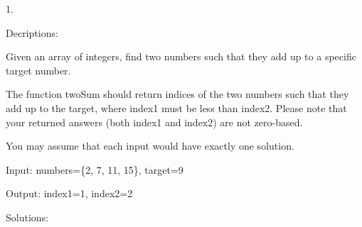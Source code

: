 1.

Decriptions:

	Given an array of integers, find two numbers such that they add up to a specific target number.

The function twoSum should return indices of the two numbers such that they add up to the target, where index1 must be less than index2. Please note that your returned answers (both index1 and index2) are not zero-based.

You may assume that each input would have exactly one solution.

Input: numbers=\{2, 7, 11, 15\}, target=9

Output: index1=1, index2=2

Solutions:


